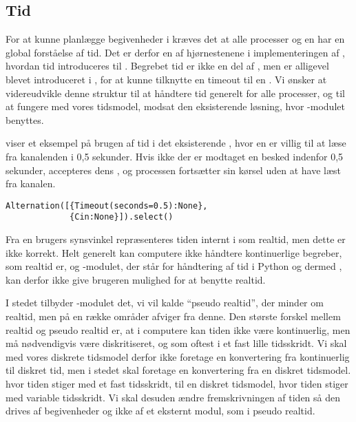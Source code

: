 \subsection{Tid} \label{sec:tid}
For at kunne planlægge begivenheder i \des kræves det at alle processer og \sched en har en global forståelse af tid.  Det er derfor en af hjørnestenene i implementeringen af \des, hvordan tid introduceres til \pycsp.  
Begrebet tid er ikke en del af \csp, men er alligevel blevet introduceret i \pycsp, for  at  kunne tilknytte en timeout til en . Vi ønsker
at videreudvikle denne struktur til at håndtere tid generelt for alle
processer, og til at fungere med vores tidsmodel, modsat den eksisterende
løsning, hvor -modulet benyttes.
 
 viser et eksempel på brugen af tid i det eksisterende \pycsp, hvor en  er villig
til at læse fra kanalenden  i 0,5 sekunder. Hvis ikke der
er modtaget en besked indenfor 0,5 sekunder, accepteres dens ,
og processen fortsætter sin kørsel uden at have læst fra kanalen.

\begin{lstlisting}[float=hbtp, 
label=Timeout,caption=Timeout i Alternation (fra dokumentationen til PyCSP)]
Alternation([{Timeout(seconds=0.5):None}, 
             {Cin:None}]).select()
\end{lstlisting}

Fra en brugers synsvinkel repræsenteres tiden internt i \pycsp som realtid, men dette er ikke korrekt. Helt generelt kan computere ikke håndtere kontinuerlige begreber, som realtid er, og -modulet, der står for håndtering af tid i Python og dermed \pycsp, kan derfor ikke give brugeren mulighed for at benytte realtid. 

 I stedet tilbyder -modulet det, vi vil kalde ``pseudo realtid'', der minder om realtid, men på en række områder afviger fra denne. Den største forskel mellem realtid og pseudo realtid er, at i computere kan tiden ikke være kontinuerlig, men må nødvendigvis være diskritiseret, og som oftest i et fast lille tidsskridt. Vi skal med vores diskrete tidsmodel derfor ikke foretage en konvertering fra kontinuerlig til diskret tid, men i stedet skal foretage en konvertering fra en diskret tidsmodel. hvor tiden stiger med et fast tidsskridt, til en diskret tidsmodel, hvor tiden stiger med variable tidsskridt. Vi skal desuden ændre fremskrivningen af tiden så den  drives af begivenheder og ikke af et eksternt modul, som i pseudo realtid. 
 
